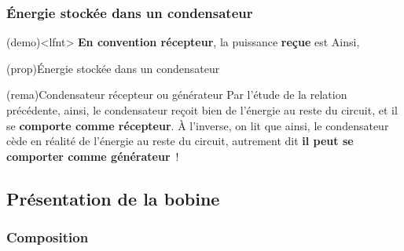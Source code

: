 \documentclass[../../main/main.tex]{subfiles}
\begin{document}
\subsubsection{Énergie stockée dans un condensateur}
\begin{tcb*}(demo)<lfnt>{}
	\textbf{En convention récepteur}, la puissance \textbf{reçue} est
	\vspace{-15pt}
	{}
	\smallbreak
	Ainsi,
	\psw{%
		\[
			\Pc_{C} = \dv{t} \left( \frac{1}{2} Cu_C{}^2 \right)
			\Rightarrow \Ec_C(t) = \frac{1}{2}C u_C(t)^2
		\]
	}%
	\vspace{-15pt}
\end{tcb*}

\begin{tcb*}[label=prop:Ec](prop){Énergie stockée dans un condensateur}
	\psw{%
	\[
		\boxed{\Ec_C(t) = \frac{1}{2}C u_C{}^2(t)}
	\]
	}%
	\vspace{-10pt}
\end{tcb*}
\begin{tcb*}[label=rema:genrec, sidebyside](rema){Condensateur récepteur ou
			générateur}
	Par l'étude de la relation précédente,
	ainsi, le condensateur reçoit bien de l'énergie au reste du circuit, et il se
	\textbf{comporte comme récepteur}.
	\tcblower
	À l'inverse, on lit que
	ainsi, le condensateur cède en réalité de l'énergie au reste du circuit,
	autrement dit \textbf{il peut se comporter comme générateur}~!
\end{tcb*}

\subsection{Présentation de la bobine}
\subsubsection{Composition}
\end{document}
